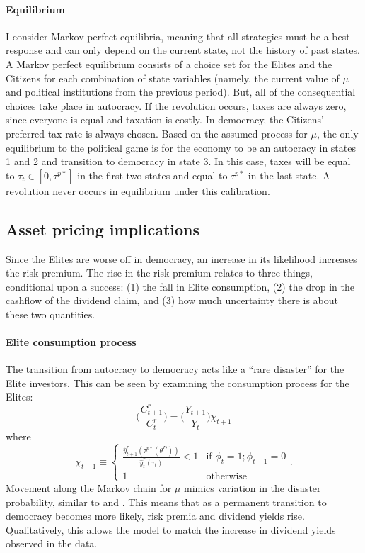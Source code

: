 \paragraph{Equilibrium}
I consider Markov perfect equilibria, meaning that all strategies must be a best response and can only depend on the current state, not the history of past states. A Markov perfect equilibrium consists of a choice set for the Elites and the Citizens for each combination of state variables (namely, the current value of $\mu$ and political institutions from the previous period). But, all of the consequential choices take place in autocracy. If the revolution occurs, taxes are always zero, since everyone is equal and taxation is costly.  In democracy, the Citizens' preferred tax rate is always chosen. Based on the assumed process for $\mu$, the only equilibrium to the political game is for the economy to be an autocracy in states 1 and 2 and transition to democracy in state 3. In this case, taxes will be equal to $\tau_t \in [0,\tau^{p*}]$ in the first two states and equal to $\tau^{p*}$ in the last state. A revolution never occurs in equilibrium under this calibration.

\subsection{Asset pricing implications}

Since the Elites are worse off in democracy, an increase in its likelihood increases the risk premium. The rise in the risk premium relates to three things, conditional upon a success: (1) the fall in Elite consumption, (2) the drop in the cashflow of the dividend claim, and (3) how much uncertainty there is about these two quantities. 

\paragraph{Elite consumption process}
The transition from autocracy to democracy acts like a ``rare disaster'' for the Elite investors. This can be seen by examining the  consumption process for the Elites:
\begin{equation}\label{eq:elite_consumption}
\bigg(\frac{C_{t+1}^r}{C_{t}^r}\bigg) = \bigg(\frac{Y_{t+1}}{Y_{t}}\bigg) \chi_{t+1}
\end{equation}
where
\begin{equation}\label{eq:dem_disaster}
\chi_{t+1} \equiv \begin{cases} 
\frac{\hat{y}_{t+1}^{r}(\tau^{p*}(\theta^{D}))}{\hat{y}_{t}^{r}(\tau_{t})} < 1 & \textrm{if }\phi_{t}=1;\phi_{t-1}=0 \\
1 & \textrm{otherwise}
\end{cases}.
\end{equation}
Movement along the Markov chain for $\mu$  mimics variation in the disaster probability, similar to \cite{Gabaix2012} and \cite{Wachter2013}.  This means that as a permanent transition to democracy becomes more likely, risk premia and dividend yields rise.  Qualitatively, this allows the model to match the increase in dividend yields observed in the data. 

